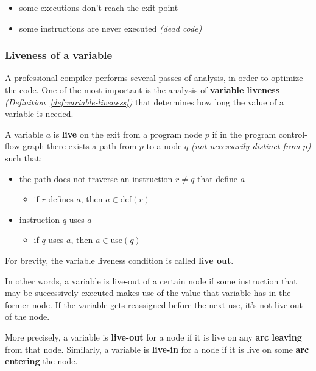 \documentclass[english]{article}
\begin{document}
\begin{itemize}
  \item some executions don't reach the exit point
  \item some instructions are never executed \textit{(dead code)}
\end{itemize}

\subsubsection{Liveness of a variable}

A professional compiler performs several passes of analysis, in order to optimize the code.
One of the most important is the analysis of \textbf{variable liveness} \textit{(Definition~\ref{def:variable-liveness})} that determines how long the value of a variable is needed.

\begin{definition}
  \label{def:variable-liveness}
  A variable \(a\) is \textbf{live} on the exit from a program node \(p\) if in the program control-flow graph there exists a path from \(p\) to a node \(q\) \textit{(not necessarily distinct from \(p\))} such that:
  \begin{itemize}
    \item the path does not traverse an instruction \(r \neq q\) that define \(a\)
          \begin{itemize}[label=\(\rightarrow\)]
            \item if \(r\) defines \(a\), then \(a \in \text{def}\left(r\right)\)
          \end{itemize}
    \item instruction \(q\) uses \(a\)
          \begin{itemize}[label=\(\rightarrow\)]
            \item if \(q\) uses \(a\), then \(a \in \text{use}\left(q\right)\)
          \end{itemize}
  \end{itemize}
  For brevity, the variable liveness condition is called \textbf{live out}.
\end{definition}

In other words, a variable is live-out of a certain node if some instruction that may be successively executed makes use of the value that variable has in the former node.
If the variable gets reassigned before the next use, it's not live-out of the node.

More precisely, a variable is \textbf{live-out} for a node if it is live on any \textbf{arc leaving} from that node.
Similarly, a variable is \textbf{live-in} for a node if it is live on some \textbf{arc entering} the node.
\end{document}
